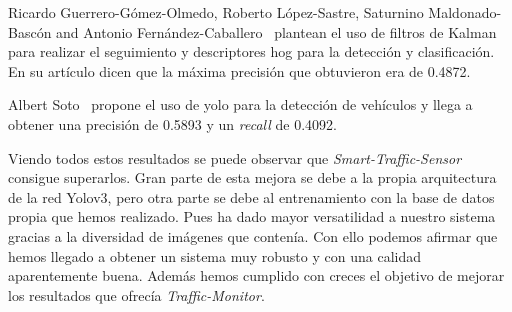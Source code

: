 Ricardo Guerrero-Gómez-Olmedo, Roberto López-Sastre, Saturnino Maldonado-Bascón and Antonio Fernández-Caballero~\cite{gram-tracking} plantean el uso de filtros de Kalman para realizar el seguimiento y descriptores \acrshort{hog} para la detección y clasificación. En su artículo dicen que la máxima precisión que obtuvieron era de 0.4872.

Albert Soto~\cite{albert_soto} propone el uso de \acrshort{yolo} para la detección de vehículos y llega a obtener una precisión de 0.5893 y un  \textit{recall} de 0.4092.


Viendo todos estos resultados se puede observar que \textit{Smart-Traffic-Sensor} consigue superarlos. Gran parte de esta mejora se debe a la propia arquitectura de la red Yolov3, pero otra parte se debe al entrenamiento con la base de datos propia que hemos realizado. Pues ha dado mayor versatilidad a nuestro sistema gracias a la diversidad de imágenes que contenía. 
Con ello podemos afirmar que hemos llegado a obtener un sistema muy robusto y con una calidad aparentemente buena. Además hemos cumplido con creces el objetivo de mejorar los resultados que ofrecía \textit{Traffic-Monitor}. 